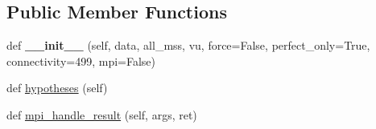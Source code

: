 \subsection*{Public Member Functions}
\begin{DoxyCompactItemize}
\item 
\mbox{\label{classCBGM_1_1hypotheses__on__unclear_1_1Hypotheses_a938d4a5e8893f1f4400bce3b9d94b0a7}} 
def {\bfseries \+\_\+\+\_\+init\+\_\+\+\_\+} (self, data, all\+\_\+mss, vu, force=False, perfect\+\_\+only=True, connectivity=499, mpi=False)
\item 
def \hyperlink{classCBGM_1_1hypotheses__on__unclear_1_1Hypotheses_a1a3028848ce6ab8da0dde0036194d42d}{hypotheses} (self)
\item 
def \hyperlink{classCBGM_1_1hypotheses__on__unclear_1_1Hypotheses_ac4520130ea50d36145e8bcd963ddc40d}{mpi\+\_\+handle\+\_\+result} (self, args, ret)
\end{DoxyCompactItemize}
